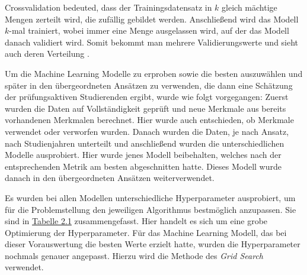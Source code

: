 Crossvalidation bedeuted, dass der Trainingsdatensatz in $k$ gleich m\"achtige Mengen zerteilt wird, die zuf\"allig gebildet werden.
Anschlie{\ss}end wird das Modell $k$-mal trainiert, wobei immer eine Menge ausgelassen wird, auf der das Modell danach validiert wird. Somit bekommt man mehrere Validierungswerte
und sieht auch deren Verteilung \cite[Seiten 31 und 32]{handson}.

Um die Machine Learning Modelle zu erproben sowie die besten auszuw\"ahlen und sp\"ater in den \"ubergeordneten Ans\"atzen zu verwenden,
die dann eine Sch\"atzung der pr\"ufungsaktiven Studierenden ergibt, wurde wie folgt vorgegangen: Zuerst wurden die Daten auf Vollst\"andigkeit geprüft und neue
Merkmale aus bereits vorhandenen Merkmalen berechnet. Hier wurde auch entschieden, ob Merkmale verwendet oder verworfen wurden.
Danach wurden die Daten, je nach Ansatz, nach Studienjahren unterteilt und anschlie{\ss}end wurden die unterschiedlichen Modelle ausprobiert. Hier wurde jenes Modell
beibehalten, welches nach der entsprechenden Metrik am besten abgeschnitten hatte.
Dieses Modell wurde danach in den \"ubergeordneten Ans\"atzen weiterverwendet.

Es wurden bei allen Modellen unterschiedliche Hyperparameter ausprobiert, um f\"ur die Problemstellung den jeweiligen
Algorithmus bestm\"oglich anzupassen. Sie sind in \hyperref[tab:hyperparameter]{Tabelle 2.1} zusammengefasst. Hier handelt es sich
um eine grobe Optimierung der Hyperparameter. F\"ur das Machine Learning Modell, das bei dieser Vorauswertung die besten Werte erzielt hatte,
wurden die Hyperparameter nochmals genauer angepasst. Hierzu wird die Methode des \textit{Grid Search} verwendet.

